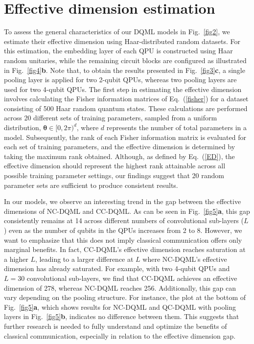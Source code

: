 \documentclass[aps,prx,reprint,amsmath,amssymb,superscriptaddress,nobibnotes,showpacs]{revtex4-2}
\begin{document}
\newpage


\appendix

\section{Effective dimension estimation}\label{appA}
To assess the general characteristics of our DQML models in Fig.~\ref{fig2}, we estimate their effective dimension using Haar-distributed random datasets. For this estimation, the embedding layer of each QPU is constructed using Haar random unitaries, while the remaining circuit blocks are configured as illustrated in Fig.~\ref{fig4}\textbf{b}. Note that, to obtain the results presented in Fig.~\ref{fig3}\textbf{c}, a single pooling layer is applied for two 2-qubit QPUs, whereas two pooling layers are used for two 4-qubit QPUs. The first step in estimating the effective dimension involves calculating the Fisher information matrices of Eq.~(\ref{fisher}) for a dataset consisting of 500 Haar random quantum states. These calculations are performed across 20 different sets of training parameters, sampled from a uniform distribution, $\boldsymbol{\theta} \in [0,2\pi)^d$, where $d$ represents the number of total parameters in a model. Subsequently, the rank of each Fisher information matrix is evaluated for each set of training parameters, and the effective dimension is determined by taking the maximum rank obtained. Although, as defined by Eq.~(\ref{ED}), the effective dimension should represent the highest rank attainable across all possible training parameter settings, our findings suggest that 20 random parameter sets are sufficient to produce consistent results. 

In our models, we observe an interesting trend in the gap between the effective dimensions of NC-DQML and CC-DQML. As can be seen in Fig.~\ref{fig5}\textbf{a}, this gap consistently remains at 14 across different numbers of convolutional sub-layers ($L$) even as the number of qubits in the QPUs increases from 2 to 8. However, we want to emphasize that this does not imply  classical communication offers only marginal benefits. In fact, CC-DQML's effective dimension reaches saturation at a higher $L$, leading to a larger difference at $L$ where NC-DQML's effective dimension has already saturated. For example, with two 4-qubit QPUs and $L=30$ convolutional sub-layers, we find that CC-DQML achieves an effective dimension of 278, whereas NC-DQML reaches 256. Additionally, this gap can vary depending on the pooling structure. For instance, the plot at the bottom of Fig.~\ref{fig5}\textbf{a}, which shows results for NC-DQML and QC-DQML with pooling layers in Fig.~\ref{fig5}\textbf{b}, indicates no difference between them. This suggests that further research is needed to fully understand and optimize the benefits of classical communication, especially in relation to the effective dimension gap.
\end{document}
